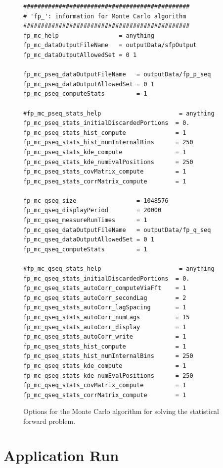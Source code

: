 \begin{figure}[h!]
\begin{center}
\begin{verbatim}
###############################################
# 'fp_': information for Monte Carlo algorithm
###############################################
fp_mc_help                 = anything
fp_mc_dataOutputFileName   = outputData/sfpOutput
fp_mc_dataOutputAllowedSet = 0 1

fp_mc_pseq_dataOutputFileName   = outputData/fp_p_seq
fp_mc_pseq_dataOutputAllowedSet = 0 1
fp_mc_pseq_computeStats         = 1

#fp_mc_pseq_stats_help                      = anything
fp_mc_pseq_stats_initialDiscardedPortions  = 0.
fp_mc_pseq_stats_hist_compute              = 1
fp_mc_pseq_stats_hist_numInternalBins      = 250
fp_mc_pseq_stats_kde_compute               = 1
fp_mc_pseq_stats_kde_numEvalPositions      = 250
fp_mc_pseq_stats_covMatrix_compute         = 1
fp_mc_pseq_stats_corrMatrix_compute        = 1

fp_mc_qseq_size                 = 1048576
fp_mc_qseq_displayPeriod        = 20000
fp_mc_qseq_measureRunTimes      = 1
fp_mc_qseq_dataOutputFileName   = outputData/fp_q_seq
fp_mc_qseq_dataOutputAllowedSet = 0 1
fp_mc_qseq_computeStats         = 1

#fp_mc_qseq_stats_help                      = anything
fp_mc_qseq_stats_initialDiscardedPortions  = 0.
fp_mc_qseq_stats_autoCorr_computeViaFft    = 1
fp_mc_qseq_stats_autoCorr_secondLag        = 2
fp_mc_qseq_stats_autoCorr_lagSpacing       = 1
fp_mc_qseq_stats_autoCorr_numLags          = 15
fp_mc_qseq_stats_autoCorr_display          = 1
fp_mc_qseq_stats_autoCorr_write            = 1
fp_mc_qseq_stats_hist_compute              = 1
fp_mc_qseq_stats_hist_numInternalBins      = 250
fp_mc_qseq_stats_kde_compute               = 1
fp_mc_qseq_stats_kde_numEvalPositions      = 250
fp_mc_qseq_stats_covMatrix_compute         = 1
fp_mc_qseq_stats_corrMatrix_compute        = 1
\end{verbatim}
\end{center}
\caption{
Options for the Monte Carlo algorithm for solving the statistical forward problem.
}
\label{fig-options-input-3}
\end{figure}

\clearpage
\section{Application Run}\label{sc-appl-run}

